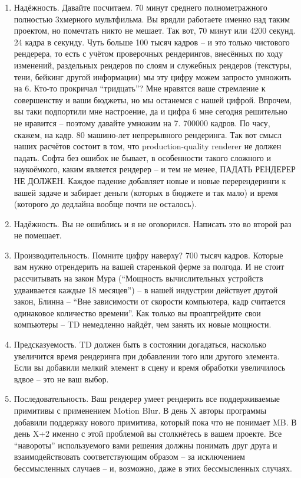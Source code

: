 \begin{enumerate}
\item                    Надёжность. Давайте посчитаем. 70 минут
    среднего полнометражного полностью 3хмерного мультфильма. Вы врядли
    работаете именно над таким проектом, но помечтать никто не мешает.
    Так вот, 70 минут или 4200 секунд. 24 кадра в секунду. Чуть больше
    100 тысяч кадров – и это только чистового рендерера, то есть с
    учётом проверочных рендерингов, внесённых по ходу изменений,
    раздельных рендеров по слоям и служебных рендеров (текстуры, тени,
    бейкинг другой информации) мы эту цифру можем запросто умножить на
    6. Кто-то прокричал “тридцать”? Мне нравятся ваше стремление к
    совершенству и ваши бюджеты, но мы останемся с нашей цифрой.
    Впрочем, вы таки подпортили мне настроение, да и цифра 6 мне
    сегодня решительно не нравится – поэтому давайте умножим на 7.
    700000 кадров. По часу, скажем, на кадр. 80 машино-лет непрерывного
    рендеринга. Так вот смысл наших расчётов состоит в том, что production-quality renderer не должен падать. Софта без ошибок не бывает, в особенности
    такого сложного и наукоёмкого, каким является рендерер – и тем не
    менее, ПАДАТЬ РЕНДЕРЕР НЕ ДОЛЖЕН. Каждое падение добавляет новые и
    новые перерендеринги к вашей задаче и забирает деньги (которых в
    бюджете и так мало) и время (которого до дедлайна вообще почти не
    осталось).
  
\item                   Надёжность. Вы не ошиблись и я не
    оговорился. Написать это во второй раз не помешает.
  

\item                   Производительность. Помните цифру
    наверху? 700 тысяч кадров. Которые вам нужно отрендерить на вашей
    старенькой ферме за полгода. И не стоит рассчитывать на закон Мура
    (“Мощность вычислительных устройств удваивается каждые 18 месяцев”)
    – в нашей индустрии действует другой закон, Блинна – “Вне
    зависимости от скорости компьютера, кадр считается одинаковое
    количество времени”. Как только вы проапгрейдите свои компьютеры
    – TD немедленно найдёт, чем занять их новые
    мощности.
  

\item                   Предсказуемость. TD должен быть в
    состоянии догадаться, насколько увеличится время рендеринга при
    добавлении того или другого элемента. Если вы добавили мелкий
    элемент в сцену и время обработки увеличилось вдвое – это не ваш
    выбор.
  

\item                   Последовательность. Ваш рендерер умеет
    рендерить все поддерживаемые примитивы с применением Motion Blur. В
    день X авторы программы добавили поддержку нового
    примитива, который пока что не понимает MB. В день X+2
    именно с этой проблемой вы столкнётесь в вашем проекте. Все
    “навороты” используемого вами решения должны понимать друг друга и
    взаимодействовать соответствующим образом – за исключением
    бессмысленных случаев – и, возможно, даже в этих бессмысленных
    случаях.
  


\end{enumerate}
